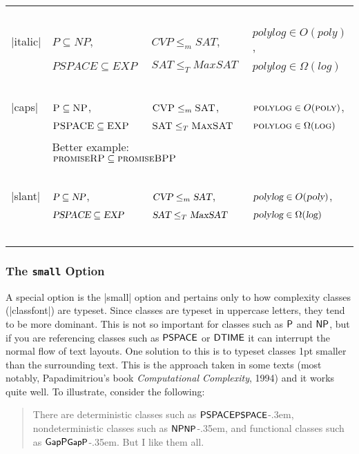 \documentclass{ltxdoc}
\begin{document}
\begin{table}[h]
\begin{tabular}{lp{3cm}p{4cm}p{3.5cm}}
~\\
|italic| & $\mathit{P} \subseteq \mathit{NP}$, & $\mathit{CVP} \leq_m \mathit{SAT}$, & $\mathit{polylog} \in O(\mathit{poly})$,\\
~ & $\mathit{PSPACE} \subseteq \mathit{EXP}$ & $\mathit{SAT} \leq_T \mathit{MaxSAT}$ & $\mathit{polylog} \in \Omega(\mathit{log})$ \\
~\\
|caps| & $\textsc{P} \subseteq \textsc{NP}$, & $\textsc{CVP} \leq_m \textsc{SAT}$, & $\textsc{polylog} \in O(\textsc{poly})$,\\
~ & $\textsc{PSPACE} \subseteq \textsc{EXP}$ & $\textsc{SAT} \leq_T \textsc{MaxSAT}$ & $\textsc{polylog} \in \Omega(\textsc{log})$ \\
~ & \multicolumn{2}{l}{Better example: $\textsc{promiseRP} \subseteq \textsc{promiseBPP}$}\\
~\\
|slant| & $\textsl{P} \subseteq \textsl{NP}$, & $\textsl{CVP} \leq_m \textsl{SAT}$, & $\textsl{polylog} \in O(\textsl{poly})$,\\
~ & $\textsl{PSPACE} \subseteq \textsl{EXP}$ & $\textsl{SAT} \leq_T \textsl{MaxSAT}$ & $\textsl{polylog} \in \Omega(\textsl{log})$ \\
~\\
\end{tabular}
\end{table}

\subsubsection{The \texttt{small} Option}

A special option is the |small| option and pertains only to how
complexity classes (|classfont|) are typeset.  Since classes are
typeset in uppercase letters, they tend to be more dominant.  This
is not so important for classes such as $\P$ and $\NP$, but if you
are referencing classes such as $\PSPACE$ or $\DTIME$ it can
interrupt the normal flow of text layouts. One solution to this is
to typeset classes 1pt smaller than the surrounding text.  This is
the approach taken in some texts (most notably, Papadimitriou's book
\emph{Computational Complexity}, 1994) and it works quite well.  To
illustrate, consider the following:
\begin{quote}
There are deterministic classes such as $\PSPACE \hbox{\small
\PSPACE}$\kern-.3em, nondeterministic classes such as $\NP
\hbox{\small \NP}$\kern-.35em, and functional classes such as $\GapP
\hbox{\small \GapP}$\kern-.35em. But I like them all.
\end{quote} %
\end{document}
